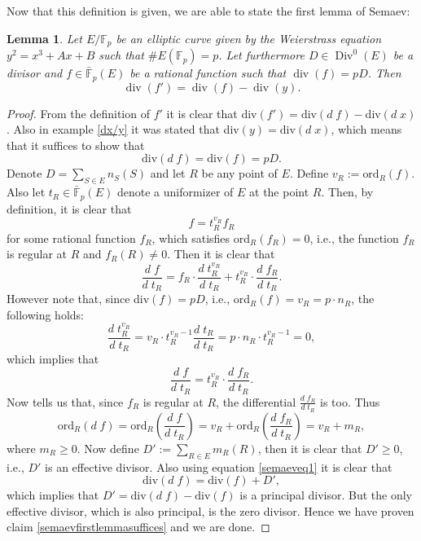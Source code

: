 \documentclass{article}
\numberwithin{equation}{section}
\newtheorem{lemma}[theorem]{Lemma}
\theoremstyle{definition}
\newcommand{\FF}[1]{{\mathbb F}_{#1}} %
\newcommand{\FFCL}[1]{{\bar {\mathbb F}}_{#1}} %
\newcommand{\Div}{\operatorname{Div}} %
\begin{document}
Now that this definition is given, we are able to state the first lemma of Semaev:

\begin{lemma}\label{Semaevfirstlemma}
Let $E/\FF{p}$ be an elliptic curve given by the Weierstrass equation $y^2=x^3+Ax+B$ such that $\#E(\FF{p})=p$. Let furthermore $D\in \Div^0 (E)$ be a divisor and $f \in \FFCL{p}(E)$ be a rational function such that $\operatorname{div}(f)=pD$. Then $$\operatorname{div}(f')=\operatorname{div}(f)-\operatorname{div}(y).$$
\end{lemma} 

\begin{proof}
From the definition of $f'$ it is clear that div$(f')=\text{div}(d\;f)-\text{div}(d\;x)$. Also in example \ref{dx/y} it was stated that div$(y)=\text{div}(d\;x)$, which means that it suffices to show that 
\begin{equation}\label{semaevfirstlemmasuffices} \text{div}(d\;f)=\text{div}(f)=pD.
\end{equation}
Denote $D=\underset{S \in E}{\sum}n_S(S)$ and let $R$ be any point of $E$. Define $v_R:=\text{ord}_R(f)$. Also let $t_R \in \FFCL{p}(E)$ denote a uniformizer of $E$ at the point $R$. Then, by definition, it is clear that $$f=t_R^{v_R}f_R$$ for some rational function $f_R$, which satisfies ord$_R(f_R)=0$, i.e., the function $f_R$ is regular at $R$ and $f_R(R)\neq 0$. Then it is clear that $$ \frac{d\;f}{d\;t_R}=f_R\cdot\frac{d\;t_R^{v_R}}{d\;t_R}+t_R^{v_R}\cdot\frac{d\;f_R}{d\;t_R}. $$ However note that, since div$(f)=pD$, i.e., ord$_R(f) = v_R=p\cdot n_R$, the following holds: $$\frac{d\;t_R^{v_R}}{d\;t_R}=v_R\cdot t_R^{v_R-1}\frac{d\;t_R}{d\;t_R}=p\cdot n_R\cdot t_R^{v_R-1}=0,$$ which implies that $$\frac{d\;f}{d\;t_R}=t_R^{v_R}\cdot\frac{d\;f_R}{d\;t_R}.$$ Now \cite[II.4.3 (b)]{Silverman} tells us that, since $f_R$ is regular at $R$, the differential $\frac{d\;f_R}{d\;t_R}$ is too. Thus 
\begin{equation}\label{semaeveq1} \text{ord}_R(d\;f) = \text{ord}_R\left(\frac{d\;f}{d\;t_R}\right)=v_R+\text{ord}_R\left(\frac{d\;f_R}{d\;t_R}\right)=v_R+m_R, \end{equation} 
where $m_R \geq 0$. Now define $D':=\sum_{R\in E} m_R(R)$, then it is clear that $D'\geq 0$, i.e., $D'$ is an effective divisor. Also using equation \ref{semaeveq1} it is clear that $$\text{div}(d\;f)=\text{div}(f)+D',$$ which implies that $D'=\text{div}(d\;f)-\text{div}(f)$ is a principal divisor. But the only effective divisor, which is also principal, is the zero divisor. Hence we have proven claim \ref{semaevfirstlemmasuffices} and we are done.
\end{proof}
\end{document}
